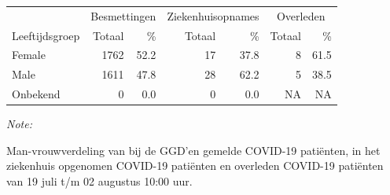 \documentclass[
  english,
  man,floatsintext]{apa6}
\begin{document}
\begin{table}[H]
\centering\begingroup\fontsize{11}{13}\selectfont

\begin{threeparttable}
\begin{tabular}{lrrrrrr}
\toprule
\multicolumn{1}{c}{ } & \multicolumn{2}{c}{Besmettingen} & \multicolumn{2}{c}{Ziekenhuisopnames} & \multicolumn{2}{c}{Overleden} \\
\cmidrule(l{3pt}r{3pt}){2-3} \cmidrule(l{3pt}r{3pt}){4-5} \cmidrule(l{3pt}r{3pt}){6-7}
Leeftijdsgroep & Totaal & \% & Totaal & \% & Totaal & \%\\
\midrule
Female & 1762 & 52.2 & 17 & 37.8 & 8 & 61.5\\
Male & 1611 & 47.8 & 28 & 62.2 & 5 & 38.5\\
Onbekend & 0 & 0.0 & 0 & 0.0 & NA & NA\\
\bottomrule
\end{tabular}
\begin{tablenotes}
\item \textit{Note: } 
\item Man-vrouwverdeling van bij de GGD’en gemelde COVID-19 patiënten, in het ziekenhuis opgenomen COVID-19 patiënten en overleden COVID-19 patiënten van 19 juli t/m 02 augustus 10:00 uur.
\end{tablenotes}
\end{threeparttable}
\endgroup{}
\end{table}
\newpage
\end{document}
